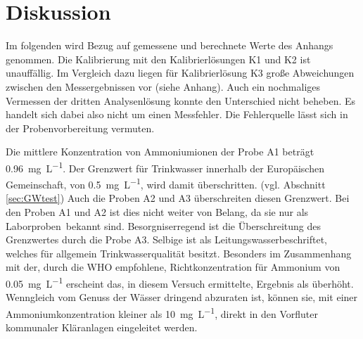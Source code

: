 \newpage
\section{Diskussion}
\label{sec:diskussion}
Im folgenden wird Bezug auf gemessene und berechnete Werte des Anhangs genommen.
Die Kalibrierung mit den Kalibrierlösungen K1 und K2 ist unauffällig. Im Vergleich dazu liegen für Kalibrierlösung K3 große Abweichungen zwischen den Messergebnissen vor (siehe Anhang). Auch ein nochmaliges Vermessen der dritten Analysenlösung konnte den Unterschied nicht beheben. Es handelt sich dabei also nicht um einen Messfehler. Die Fehlerquelle lässt sich in der Probenvorbereitung vermuten.

Die mittlere Konzentration von Ammoniumionen der Probe A1 beträgt \SI{0,96}{\milli\gram\per\liter}. Der Grenzwert für Trinkwasser innerhalb der Europäischen Gemeinschaft, von \SI{0,5}{\milli\gram\per\liter}, wird damit überschritten. (vgl. Abschnitt \ref{sec:GWtest}) Auch die Proben A2 und A3 überschreiten diesen Grenzwert. Bei den Proben A1 und A2 ist dies nicht weiter von Belang, da sie nur als \glqq Laborproben\grqq\, bekannt sind. Besorgniserregend ist die Überschreitung des Grenzwertes durch die Probe A3. Selbige ist als \glqq Leitungswasser\grqq beschriftet, welches für allgemein Trinkwasserqualität besitzt. Besonders im Zusammenhang mit der, durch die WHO empfohlene, Richtkonzentration für Ammonium von \SI{0,05}{\milli\gram\per\liter} erscheint das, in diesem Versuch ermittelte, Ergebnis als überhöht. Wenngleich vom Genuss der Wässer dringend abzuraten ist, können sie, mit einer Ammoniumkonzentration kleiner als \SI{10}{\milli\gram\per\liter}, direkt in den Vorfluter kommunaler Kläranlagen eingeleitet werden. 


